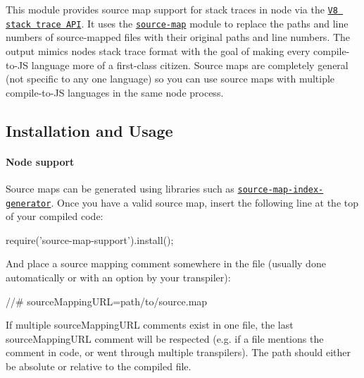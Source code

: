 \href{https://travis-ci.org/evanw/node-source-map-support}{\tt }

This module provides source map support for stack traces in node via the \href{http://code.google.com/p/v8/wiki/JavaScriptStackTraceApi}{\tt V8 stack trace A\+PI}. It uses the \href{https://github.com/mozilla/source-map}{\tt source-\/map} module to replace the paths and line numbers of source-\/mapped files with their original paths and line numbers. The output mimics node\textquotesingle{}s stack trace format with the goal of making every compile-\/to-\/\+JS language more of a first-\/class citizen. Source maps are completely general (not specific to any one language) so you can use source maps with multiple compile-\/to-\/\+JS languages in the same node process.

\subsection*{Installation and Usage}

\paragraph*{Node support}




Source maps can be generated using libraries such as \href{https://github.com/twolfson/source-map-index-generator}{\tt source-\/map-\/index-\/generator}. Once you have a valid source map, insert the following line at the top of your compiled code\+:


\begin{DoxyCode}
require('source-map-support').install();
\end{DoxyCode}


And place a source mapping comment somewhere in the file (usually done automatically or with an option by your transpiler)\+:


\begin{DoxyCode}
//# sourceMappingURL=path/to/source.map
\end{DoxyCode}


If multiple source\+Mapping\+U\+RL comments exist in one file, the last source\+Mapping\+U\+RL comment will be respected (e.\+g. if a file mentions the comment in code, or went through multiple transpilers). The path should either be absolute or relative to the compiled file.

